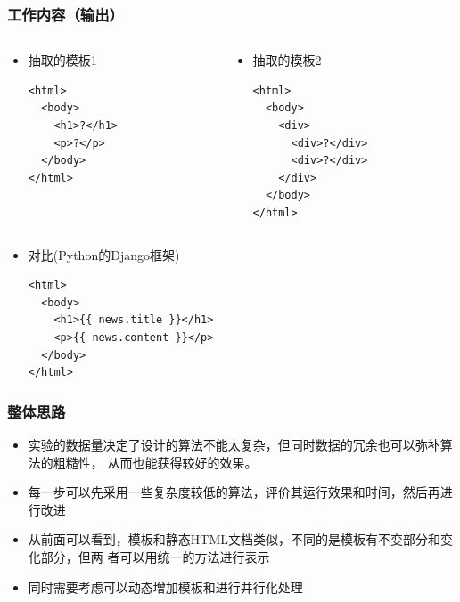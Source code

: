 \documentclass[11pt,presentation]{beamer}
\begin{document}
\begin{frame}[fragile]
\frametitle{工作内容（输出）}
\label{sec-2-2}
\begin{columns}[t]
\begin{column}{0.5\textwidth}
\begin{itemize}

\item 抽取的模板1\\
\label{sec-2-2-1}%
\lstset{extendedchars=false,basicstyle=\ttfamily\footnotesize,escapechar=`,breaklines,language=HTML}
\begin{lstlisting}
<html>         
  <body>
    <h1>?</h1>
    <p>?</p>
  </body>
</html>
\end{lstlisting}
\end{itemize} %
\end{column}
\begin{column}{0.5\textwidth}
\begin{itemize}

\item 抽取的模板2\\
\label{sec-2-2-2}%
\lstset{extendedchars=false,basicstyle=\ttfamily\footnotesize,escapechar=`,breaklines,language=HTML}
\begin{lstlisting}
<html>
  <body>
    <div>
      <div>?</div>
      <div>?</div>
    </div>
  </body>
</html>
\end{lstlisting}
\end{itemize} %
\end{column}
\end{columns}
\begin{itemize}

\item 对比(Python的Django框架)\\
\label{sec-2-2-3}%
\lstset{extendedchars=false,basicstyle=\ttfamily\footnotesize,escapechar=`,breaklines,language=HTML}
\begin{lstlisting}
<html>
  <body>
    <h1>{{ news.title }}</h1>
    <p>{{ news.content }}</p>
  </body>
</html>
\end{lstlisting}


\end{itemize} %
\end{frame}
\begin{frame}
\frametitle{整体思路}
\label{sec-2-3}

\begin{itemize}
\item 实验的数据量决定了设计的算法不能太复杂，但同时数据的冗余也可以弥补算法的粗糙性，
  从而也能获得较好的效果。
\item 每一步可以先采用一些复杂度较低的算法，评价其运行效果和时间，然后再进行改进
\item 从前面可以看到，模板和静态HTML文档类似，不同的是模板有不变部分和变化部分，但两
  者可以用统一的方法进行表示
\item 同时需要考虑可以动态增加模板和进行并行化处理
\end{itemize}
\end{frame}
\end{document}
